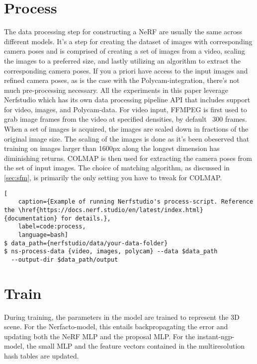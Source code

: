 \section{Process}
The data processing step for constructing a NeRF are usually the same across different models. It's a step for creating the dataset of images with corresponding camera poses and is comprised of creating a set of images from a video, scaling the images to a preferred size, and lastly utilizing an algorithm to extract the corresponding camera poses. If you a priori have access to the input images and refined camera poses, as is the case with the Polycam-integration, there's not much pre-processing necessary. All the experiments in this paper leverage Nerfstudio which has its own data processing pipeline API that includes support for video, images, and Polycam-data. For video input, FFMPEG \cite{tomar2006converting} is first used to grab image frames from the video at specified densities, by default ~300 frames. When a set of images is acquired, the images are scaled down in fractions of the original image size. The scaling of the images is done as it's been obeserved that training on images larger than 1600px along the longest dimension has diminishing returns. COLMAP is then used for extracting the camera poses from the set of input images. The choice of matching algorithm, as discussed in \autoref{sec:sfm}, is primarily the only setting you have to tweak for COLMAP.

\begin{lstlisting}[
    caption={Example of running Nerfstudio's process-script. Reference the \href{https://docs.nerf.studio/en/latest/index.html}{documentation} for details.},
    label=code:process,
    language=bash]
$ data_path={nerfstudio/data/your-data-folder}
$ ns-process-data {video, images, polycam} --data $data_path 
  --output-dir $data_path/output
\end{lstlisting}


\section{Train}
During training, the parameters in the model are trained to represent the 3D scene. For the Nerfacto-model, this entails backpropagating the error and updating both the NeRF MLP and the proposal MLP. For the instant-ngp-model, the small MLP and the feature vectors contained in the multiresolution hash tables are updated.


